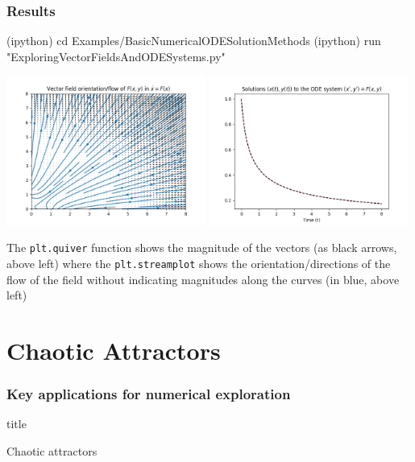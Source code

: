 \documentclass[usenames,svgnames,dvipsnames,10pt]{beamer}
\newcommand{\TitleBoxed}[1]{
     \begin{beamercolorbox}[sep=8pt,center,shadow=true,rounded=true]{title}
          \usebeamerfont{title}#1\vskip 0.6cm\par%
     \end{beamercolorbox}
}
\begin{document}
\begin{frame}[fragile]
\frametitle{Results}

\begin{center}
\begin{code}
(ipython) cd Examples/BasicNumericalODESolutionMethods
(ipython) run "ExploringVectorFieldsAndODESystems.py"
\end{code}
\includegraphics[width=0.49\textwidth]{../Images/Exploring2DSolutionsExample-VectorFieldPlots-v1.png}
\includegraphics[width=0.49\textwidth]{../Images/Exploring2DSystemSolutions-xtytSolutionPlots-v2.png}
\end{center}

{\small 
The \texttt{plt.quiver} function shows the magnitude of the vectors (as black arrows, above left) 
where the \texttt{plt.streamplot} shows the orientation/directions of the flow of the field 
without indicating magnitudes along the curves (in blue, above left) 
}

\end{frame}


\section{Chaotic Attractors} 

\begin{frame}
\frametitle{Key applications for numerical exploration} 

\TitleBoxed{
     \huge{\centerline{Chaotic attractors}}
}

\end{frame}
\end{document}
